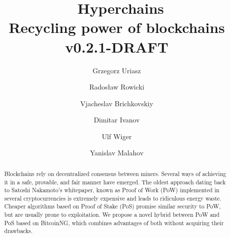 \documentclass{article}
\title{\huge \Aet\ Hyperchains \\[0.5em]
  \large Recycling power of blockchains
  \\[1em] v0.2.1-DRAFT }
\author{ Grzegorz Uriasz
  \and Radosław Rowicki
  \and Vjacheslav Brichkovskiy
  \and Dimitar Ivanov
  \and Ulf Wiger
  \and Yanislav Malahov
}
\begin{document}
\maketitle

\begin{abstract}
  Blockchains rely on decentralized consensus between miners. Several ways of
  achieving it in a safe, provable, and fair manner have emerged. The oldest
  approach dating back to Satoshi Nakamoto's whitepaper, known as Proof of Work
  (PoW) implemented in several cryptocurrencies is extremely expensive and
  leads to ridiculous energy waste. Cheaper algorithms based on Proof of Stake (PoS)
  promise similar security to PoW, but are usually prone to exploitation. We
  propose a novel hybrid between PoW and PoS based on BitcoinNG, which combines
  advantages of both without acquiring their drawbacks.
\end{abstract}









 
\end{document}
